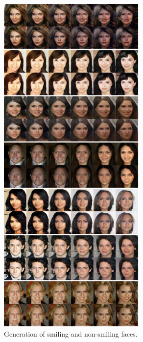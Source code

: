 \begin{figure}[thb!]
\centering
\includegraphics[trim=0in 0in 0in 0in, width=0.65\textwidth]{result_face_smiling_big2.pdf}
\caption{Generation of smiling and non-smiling faces.}
\label{fig::result_smiling2}
\end{figure}
